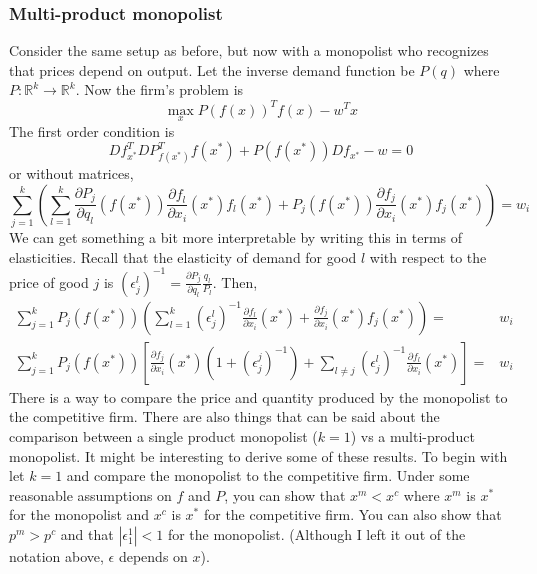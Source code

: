 \documentclass[compress]{beamer}
\def\R{\mathbb{R}}
\renewcommand{\to}{{\rightarrow}}
\begin{document}
\subsubsection{Multi-product monopolist}
Consider the same setup as before, but now with a monopolist who
recognizes that prices depend on output. Let the inverse demand
function be $P(q)$ where $P:\R^k \to \R^k$. Now the firm's problem
is 
\[ \max_x P(f(x))^T f(x) - w^T x \]
The first order condition is
\[ Df_{x^*}^T DP_{f(x^*)}^T f(x^*) + P(f(x^*)) Df_{x^*} - w = 0 \]
or without matrices,
\[ \sum_{j=1}^k \left( \sum_{l=1}^k \frac{\partial P_j}{\partial q_l}(f(x^*))
  \frac{\partial f_l}{\partial x_i}(x^*) f_l(x^*) + 
  P_j(f(x^*)) \frac{\partial f_j}{\partial x_i}(x^*) f_j(x^*) \right)
= w_i \]
We can get something a bit more interpretable by writing this in terms
of elasticities. Recall that the elasticity of demand for good $l$
with respect to the price of good $j$ is $(\epsilon^l_j)^{-1}=
\frac{\partial P_j}{\partial q_l} \frac{q_l}{P_l}$. Then,
\begin{align*}
  \sum_{j=1}^k P_j(f(x^*)) \left(\sum_{l=1}^k (\epsilon^l_j)^{-1} \frac{\partial
      f_l}{\partial x_i}(x^*) +  \frac{\partial f_j}{\partial x_i}(x^*) f_j(x^*) \right)
  = & w_i \\
  \sum_{j=1}^k P_j(f(x^*)) \left[\frac{\partial f_j}{\partial x_i}(x^*)
    \left(1 + (\epsilon_j^j)^{-1} \right) + \sum_{l \neq j}
  (\epsilon_j^l)^{-1} \frac{\partial f_l}{\partial x_i}(x^*) \right] = & w_i 
\end{align*}
There is a way to compare the price and quantity produced by the
monopolist to the competitive firm. There are also things that can be
said about the comparison between a single product monopolist ($k=1$)
vs a multi-product monopolist. It might be interesting to derive some
of these results. To begin with let $k = 1$ and compare the monopolist
to the competitive firm. Under some reasonable assumptions on $f$ and
$P$, you can show that $x^m < x^c$ where $x^m$ is $x^*$ for the
monopolist and $x^c$ is $x^*$ for the competitive firm. You can also
show that $p^m>p^c$ and that $|\epsilon^1_1| < 1$ for the
monopolist. (Although I left it out of the notation above, $\epsilon$
depends on $x$). 
\end{document}
